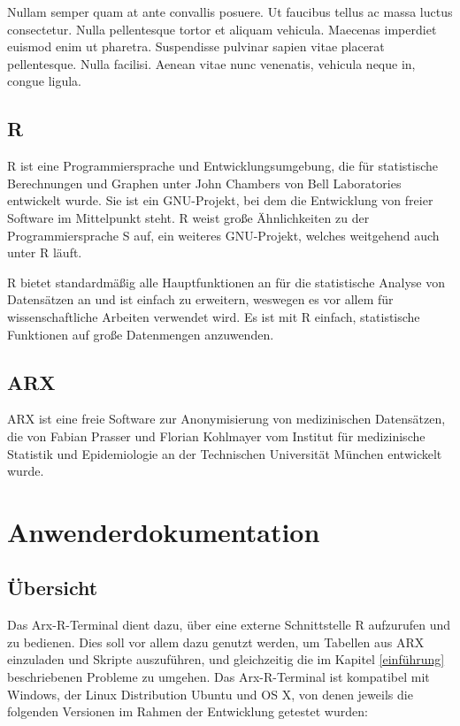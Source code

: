 \documentclass[a4paper, 12pt]{report} %
\begin{document}
Nullam semper quam at ante convallis posuere. Ut faucibus tellus ac massa luctus consectetur. Nulla pellentesque tortor et aliquam vehicula. Maecenas imperdiet euismod enim ut pharetra. Suspendisse pulvinar sapien vitae placerat pellentesque. Nulla facilisi. Aenean vitae nunc venenatis, vehicula neque in, congue ligula.


\section*{R}\label{r}
R ist eine Programmiersprache und Entwicklungsumgebung, die für statistische Berechnungen und Graphen unter John Chambers von Bell Laboratories entwickelt wurde. Sie ist ein GNU-Projekt, bei dem die Entwicklung von freier Software im Mittelpunkt steht. R weist große Ähnlichkeiten zu der Programmiersprache S auf, ein weiteres GNU-Projekt, welches weitgehend auch unter R läuft. \cite{rproject}

R bietet standardmäßig alle Hauptfunktionen an für die statistische Analyse von Datensätzen an und ist einfach zu erweitern, weswegen es vor allem für wissenschaftliche Arbeiten verwendet wird. Es ist mit R einfach, statistische Funktionen auf große Datenmengen anzuwenden.  



\section*{ARX}
ARX ist eine freie Software zur Anonymisierung von medizinischen Datensätzen, die von Fabian Prasser und Florian Kohlmayer vom Institut für medizinische Statistik und Epidemiologie an der Technischen Universität München entwickelt wurde.



\chapter{Anwenderdokumentation}
\section{Übersicht}
Das Arx-R-Terminal dient dazu, über eine externe Schnittstelle R aufzurufen und zu bedienen. Dies soll vor allem dazu genutzt werden, um Tabellen aus ARX einzuladen und Skripte auszuführen, und gleichzeitig die im Kapitel \ref{einführung} beschriebenen Probleme zu umgehen. Das Arx-R-Terminal ist kompatibel mit Windows, der Linux Distribution Ubuntu und OS X, von denen jeweils die folgenden Versionen im Rahmen der Entwicklung getestet wurden: 
\end{document}
